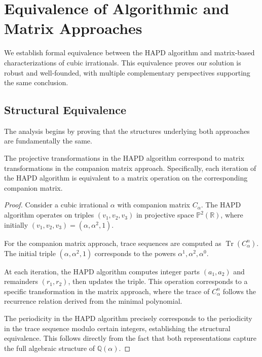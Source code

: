 \section{Equivalence of Algorithmic and Matrix Approaches}\label{sec:equivalence}

We establish formal equivalence between the HAPD algorithm and matrix-based characterizations of cubic irrationals. This equivalence proves our solution is robust and well-founded, with multiple complementary perspectives supporting the same conclusion.

\subsection{Structural Equivalence}

The analysis begins by proving that the structures underlying both approaches are fundamentally the same.

\begin{theorem}\label{thm:struct_equiv}
The projective transformations in the HAPD algorithm correspond to matrix transformations in the companion matrix approach. Specifically, each iteration of the HAPD algorithm is equivalent to a matrix operation on the corresponding companion matrix.
\end{theorem}

\begin{proof}
Consider a cubic irrational $\alpha$ with companion matrix $C_{\alpha}$. The HAPD algorithm operates on triples $(v_1, v_2, v_3)$ in projective space $\mathbb{P}^2(\mathbb{R})$, where initially $(v_1, v_2, v_3) = (\alpha, \alpha^2, 1)$.

For the companion matrix approach, trace sequences are computed as $\operatorname{Tr}(C_{\alpha}^n)$. The initial triple $(\alpha, \alpha^2, 1)$ corresponds to the powers $\alpha^1, \alpha^2, \alpha^0$.

At each iteration, the HAPD algorithm computes integer parts $(a_1, a_2)$ and remainders $(r_1, r_2)$, then updates the triple. This operation corresponds to a specific transformation in the matrix approach, where the trace of $C_{\alpha}^n$ follows the recurrence relation derived from the minimal polynomial.

The periodicity in the HAPD algorithm precisely corresponds to the periodicity in the trace sequence modulo certain integers, establishing the structural equivalence. This follows directly from the fact that both representations capture the full algebraic structure of $\mathbb{Q}(\alpha)$.
\end{proof}


